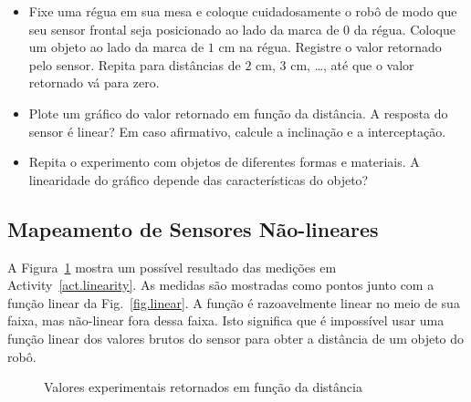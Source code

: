 \begin{framed}
\begin{itemize}
\item Fixe uma régua em sua mesa e coloque cuidadosamente o robô de modo que seu sensor frontal seja posicionado ao lado da marca de $0$ da régua. Coloque um objeto ao lado da marca de $1$ cm na régua. Registre o valor retornado pelo sensor. Repita para distâncias de $2$ cm, $3$ cm, \ldots, até que o valor retornado vá para zero.
\item Plote um gráfico do valor retornado em função da distância. A resposta do sensor é linear? Em caso afirmativo, calcule a inclinação e a interceptação.
\item Repita o experimento com objetos de diferentes formas e materiais. A linearidade do gráfico depende das características do objeto?
\end{itemize}
\end{framed}

\subsection{Mapeamento de Sensores Não-lineares}

A Figura~\ref{fig.nonlinear} mostra um possível resultado das medições em Activity~\ref{act.linearity}. As medidas são mostradas como pontos junto com a função linear da Fig.~\ref{fig.linear}. A função é razoavelmente linear no meio de sua faixa, mas não-linear fora dessa faixa. Isto significa que é impossível usar uma função linear dos valores brutos do sensor para obter a distância de um objeto do robô.

\begin{figure}
\begin{center}
\caption{Valores experimentais retornados em função da distância}\label{fig.nonlinear}
\end{center}
\end{figure}

